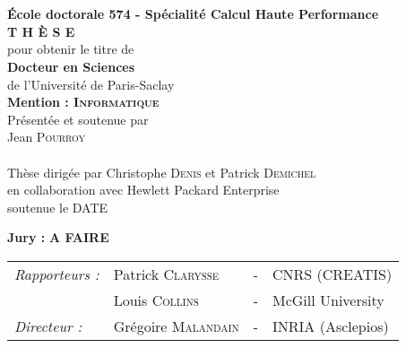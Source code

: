 \begin{titlepage}
\begin{center}
 \\
\vspace*{0.3cm}
 \\
\noindent \textbf{École doctorale 574 -  Spécialité Calcul Haute Performance} \\
\vspace*{0.5cm}
\noindent \Huge \textbf{T H È S E} \\
\vspace*{0.3cm}
\noindent \large {pour obtenir le titre de} \\
\vspace*{0.3cm}
\noindent \LARGE \textbf{Docteur en Sciences} \\
\vspace*{0.3cm}
\noindent \Large de l'Université de Paris-Saclay \\
\noindent \Large \textbf{Mention : \textsc{Informatique}}\\
\vspace*{0.4cm}
\noindent \large {Présentée et soutenue par\\}
\noindent \LARGE Jean \textsc{Pourroy} \\
\vspace*{0.8cm}
 \\
\vspace*{0.8cm}
\noindent \Large Thèse dirigée par Christophe \textsc{Denis} et Patrick \textsc{Demichel} \\
\vspace*{0.2cm}
\noindent \Large en collaboration avec Hewlett Packard Enterprise \\
\vspace*{0.2cm}
\noindent \large soutenue le DATE \\
\vspace*{0.5cm}
\end{center}
\noindent \large \textbf{Jury :} \textbf{A FAIRE} \\
\begin{center}
\noindent \large 
\begin{tabular}{llcl}
      \textit{Rapporteurs :}	& Patrick \textsc{Clarysse}		& - & CNRS (CREATIS)\\
				& Louis \textsc{Collins}		& - & McGill University\\
      \textit{Directeur :}	& Grégoire \textsc{Malandain}		& - & INRIA (Asclepios)\\

\end{tabular}
\end{center}
\end{titlepage}
